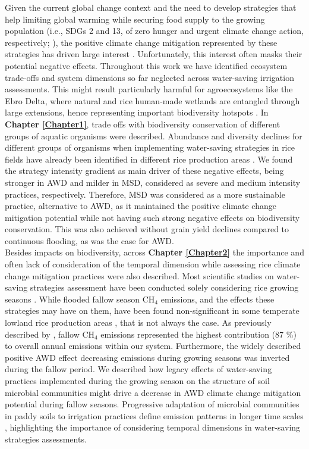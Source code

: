 Given the current global change context and the need to develop strategies that help limiting global warming while securing food supply to the growing population (i.e., SDGs 2 and 13, of zero hunger and urgent climate change action, respectively; \cite{unitednations2015}), the positive climate change mitigation represented by these strategies has driven large interest \citep{linquist2018, gao2024effects}.  Unfortunately, this interest often masks their potential negative effects. Throughout this work we have identified ecosystem trade-offs and system dimensions so far neglected across water-saving irrigation assessments. This might result particularly harmful for agroecosystems like the Ebro Delta, where natural and rice human-made wetlands are entangled through large extensions, hence representing important biodiversity hotspots \citep{ibanez2010}. In \textbf{Chapter \ref{Chapter1}}, trade offs with biodiversity conservation of different groups of aquatic organisms were described. Abundance and diversity declines for different groups of organisms when implementing water-saving strategies in rice fields have already been identified in different rice production areas \citep{watanabe2013, golet2018, herring2021}. We found the strategy intensity gradient as main driver of these negative effects, being stronger in AWD and milder in MSD, considered as severe and medium intensity practices, respectively. Therefore, MSD was considered as a more sustainable practice, alternative to AWD, as it maintained the positive climate change mitigation potential while not having such strong negative effects on biodiversity conservation. This was also achieved without grain yield declines compared to continuous flooding, as was the case for AWD.\\ 

Besides impacts on biodiversity, across \textbf{Chapter \ref{Chapter2}} the importance and often lack of consideration of the temporal dimension while assessing rice climate change mitigation practices were also described. Most scientific studies on water-saving strategies assessment have been conducted solely considering rice growing seasons \citep{linquist2015, kumar2019alternate}. While flooded fallow season CH$_{4}$ emissions, and the effects these strategies may have on them, have been found non-significant in some temperate lowland rice production areas \citep{lahue2016}, that is not always the case. As previously described by \cite{martinez-eixarch2018}, fallow CH$_{4}$ emissions represented the highest contribution (87 \%) to overall annual emissions within our system. Furthermore, the widely described positive AWD effect decreasing emissions during growing seasons \citep{carrijo2017} was inverted during the fallow period. We described how legacy effects of water-saving practices implemented during the growing season on the structure of soil microbial communities might drive a decrease in AWD climate change mitigation potential during fallow seasons. Progressive adaptation of microbial communities in paddy soils to irrigation practices define emission patterns in longer time scales \citep{lagomarsino2016}, highlighting the importance of considering temporal dimensions in water-saving strategies assessments.\\

